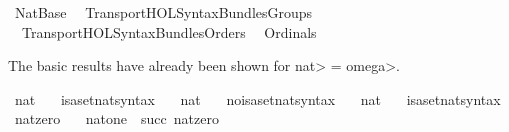 %
\begin{isabellebody}%
%
%
\isadelimdocument
%
\endisadelimdocument
%
\isatagdocument
\isanewline
\isanewline
%
\isamarkuptrue%
%
\endisatagdocument
{\isafolddocument}%
%
\isadelimdocument
%
\endisadelimdocument
%
\isadelimtheory
%
\endisadelimtheory
%
\isatagtheory
{}\isamarkupfalse%
\ Nat{\isacharunderscore}{\kern0pt}Base\isanewline
{}\isanewline
\ \ Transport{\isachardot}{\kern0pt}HOL{\isacharunderscore}{\kern0pt}Syntax{\isacharunderscore}{\kern0pt}Bundles{\isacharunderscore}{\kern0pt}Groups\isanewline
\ \ Transport{\isachardot}{\kern0pt}HOL{\isacharunderscore}{\kern0pt}Syntax{\isacharunderscore}{\kern0pt}Bundles{\isacharunderscore}{\kern0pt}Orders\isanewline
\ \ Ordinals\isanewline
{}%
\endisatagtheory
{\isafoldtheory}%
%
\isadelimtheory
%
\endisadelimtheory
%
\begin{isamarkuptext}%
The basic results have already been shown for \<nat> = \<omega>.%
\end{isamarkuptext}\isamarkuptrue%
\isamarkupfalse%
\ {\isachardoublequoteopen}nat\ {\isasymequiv}\ {\isasymomega}{\isachardoublequoteclose}\isanewline
\isanewline
{}\isamarkupfalse%
\ isa{\isacharunderscore}{\kern0pt}set{\isacharunderscore}{\kern0pt}nat{\isacharunderscore}{\kern0pt}syntax\ \ \isamarkupfalse%
\ nat\ {\isacharparenleft}{\kern0pt}{\isachardoublequoteopen}{\isasymnat}{\isachardoublequoteclose}{\isacharparenright}{\kern0pt}\ \isamarkupfalse%
\isanewline
{}\isamarkupfalse%
\ no{\isacharunderscore}{\kern0pt}isa{\isacharunderscore}{\kern0pt}set{\isacharunderscore}{\kern0pt}nat{\isacharunderscore}{\kern0pt}syntax\ \ \isamarkupfalse%
\ nat\ {\isacharparenleft}{\kern0pt}{\isachardoublequoteopen}{\isasymnat}{\isachardoublequoteclose}{\isacharparenright}{\kern0pt}\ \isamarkupfalse%
\isanewline
{}\isamarkupfalse%
\ isa{\isacharunderscore}{\kern0pt}set{\isacharunderscore}{\kern0pt}nat{\isacharunderscore}{\kern0pt}syntax\isanewline
\isanewline
{}\isamarkupfalse%
\ {\isachardoublequoteopen}nat{\isacharunderscore}{\kern0pt}zero\ {\isasymequiv}\ {\isacharbraceleft}{\kern0pt}{\isacharbraceright}{\kern0pt}{\isachardoublequoteclose}\isanewline
{}\isamarkupfalse%
\ {\isachardoublequoteopen}nat{\isacharunderscore}{\kern0pt}one\ {\isasymequiv}\ succ\ nat{\isacharunderscore}{\kern0pt}zero{\isachardoublequoteclose}\isanewline

\end{isabellebody}
